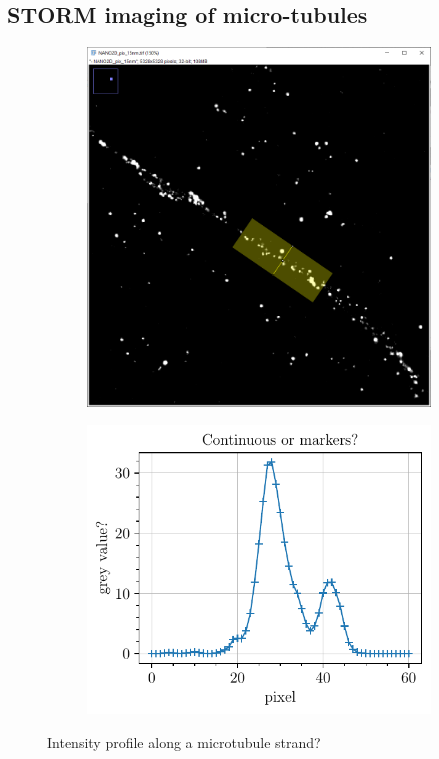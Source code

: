 \subsection{STORM imaging of micro-tubules}
\begin{figure}[htbp]
    \begin{subfigure}{0.5\textwidth}
        \includegraphics[width=\textwidth]{figures/microtubules_width_acquisition.PNG}
        \label{fig:microtubules_width_acquisition}
        \caption{}
    \end{subfigure}
    \begin{subfigure}{0.5\textwidth}
        \includegraphics[scale=1]{figures/microtubules_width.pdf}
        \label{fig:microtubules_width_analysis}
        \caption{}
    \end{subfigure}
    \label{fig:microtubules_width}
    \caption{Intensity profile along a microtubule strand?}
\end{figure}